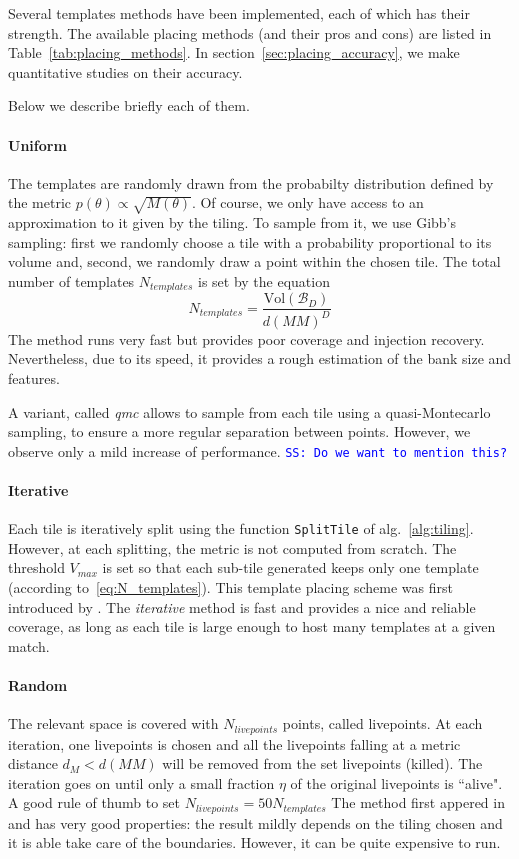 \documentclass[twocolumn,showpacs,preprintnumbers,nofootinbib,prd,
superscriptaddress,10pt]{revtex4-1}
\newcommand{\stefano}[1]{{\textcolor{blue}{\texttt{SS: #1}} }}
\begin{document}
Several templates methods have been implemented, each of which has their strength. The available placing methods (and their pros and cons) are listed in Table~\ref{tab:placing_methods}. In section~\ref{sec:placing_accuracy}, we make quantitative studies on their accuracy.

Below we describe briefly each of them.

\paragraph{Uniform}\label{par:uniform}
The templates are randomly drawn from the probabilty distribution defined by the metric $p(\theta) \propto \sqrt{M(\theta)}$.
Of course, we only have access to an approximation to it given by the tiling. To sample from it, we use Gibb's sampling: first we randomly choose a tile with a probability proportional to its volume and, second, we randomly draw a point within the chosen tile.
The total number of templates $N_{templates}$ is set by the equation
\begin{equation} \label{eq:N_templates}
	N_{templates} = \frac{\text{Vol}(\mathcal{B}_D)}{d(MM)^D}
\end{equation}
The method runs very fast but provides poor coverage and injection recovery. Nevertheless, due to its speed, it provides a rough estimation of the bank size and features.

A variant, called {\it qmc} allows to sample from each tile using a quasi-Montecarlo sampling, to ensure a more regular separation between points. However, we observe only a mild increase of performance.
\stefano{Do we want to mention this?}
\paragraph{Iterative}\label{par:iterative}
Each tile is iteratively split using the function \texttt{SplitTile} of alg.~\ref{alg:tiling}. However, at each splitting, the metric is not computed from scratch. The threshold $V_{max}$ is set so that each sub-tile generated keeps only one template (according to~\eqref{eq:N_templates}). This template placing scheme was first introduced by \cite{}.
The {\it iterative} method is fast and provides a nice and reliable coverage, as long as each tile is large enough to host many templates at a given match.
\paragraph{Random}\label{par:random}
The relevant space is covered with $N_{livepoints}$ points, called livepoints. At each iteration, one livepoints is chosen and all the livepoints falling at a metric distance $d_M<d(MM)$ will be removed from the set livepoints (killed). The iteration goes on until only a small fraction $\eta$ of the original livepoints is ``alive". A good rule of thumb to set $N_{livepoints} = 50 N_{templates}$
The method first appered in \cite{} and has very good properties: the result mildly depends on the tiling chosen and it is able take care of the boundaries. However, it can be quite expensive to run.
\end{document}

